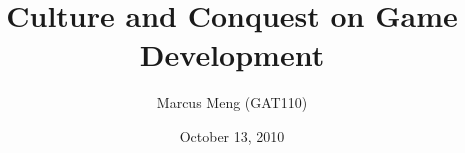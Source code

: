 \title{Culture and Conquest on Game Development}

\author{Marcus Meng (GAT110)}

\date{October 13, 2010}

